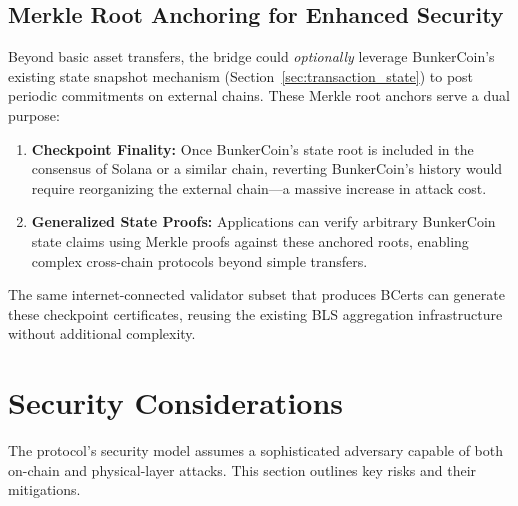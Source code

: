 \documentclass{article}
\begin{document}
\subsection{Merkle Root Anchoring for Enhanced Security}
Beyond basic asset transfers, the bridge could \emph{optionally} leverage BunkerCoin's existing state snapshot mechanism (Section~\ref{sec:transaction_state}) to post periodic commitments on external chains. These Merkle root anchors serve a dual purpose:

\begin{enumerate}
    \item \textbf{Checkpoint Finality:} Once BunkerCoin's state root is included in the consensus of Solana or a similar chain, reverting BunkerCoin's history would require reorganizing the external chain—a massive increase in attack cost.
    \item \textbf{Generalized State Proofs:} Applications can verify arbitrary BunkerCoin state claims using Merkle proofs against these anchored roots, enabling complex cross-chain protocols beyond simple transfers.
\end{enumerate}

The same internet-connected validator subset that produces BCerts can generate these checkpoint certificates, reusing the existing BLS aggregation infrastructure without additional complexity.

\section{Security Considerations}
\label{sec:security}

The protocol's security model assumes a sophisticated adversary capable of both on-chain and physical-layer attacks. This section outlines key risks and their mitigations.
\end{document}
